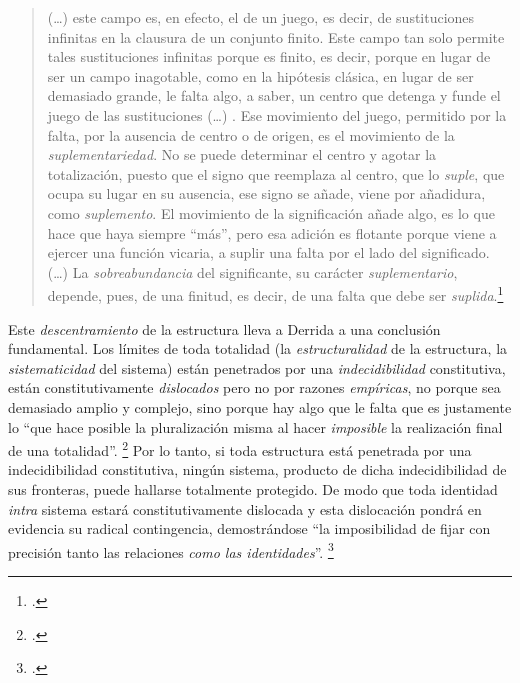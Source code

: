 \begin{quote}
(\ldots) este campo es, en efecto, el de un juego, es decir, de sustituciones infinitas en la clausura de un conjunto finito. Este campo tan solo permite tales sustituciones infinitas porque es finito, es decir, porque en lugar de ser un campo inagotable, como en la hipótesis clásica, en lugar de ser demasiado grande, le falta algo, a saber, un centro que detenga y funde el juego de las sustituciones (\ldots) . Ese movimiento del juego, permitido por la falta, por la ausencia de centro o de origen, es el movimiento de la \emph{suplementariedad}. No se puede determinar el centro y agotar la totalización, puesto que el signo que reemplaza al centro, que lo \emph{suple}, que ocupa su lugar en su ausencia, ese signo se añade, viene por añadidura, como \emph{suplemento}. El movimiento de la significación añade algo, es lo que hace que haya siempre \enquote{más}, pero esa adición es flotante porque viene a ejercer una función vicaria, a suplir una falta por el lado del significado. (\ldots) La \emph{sobreabundancia} del significante, su carácter \emph{suplementario}, depende, pues, de una finitud, es decir, de una falta que debe ser \emph{suplida}.\footcite[][397-398]{@6997-DERRIDA1989}
\end{quote}

Este \emph{descentramiento} de la estructura lleva a Derrida a una conclusión fundamental. Los límites de toda totalidad (la \emph{estructuralidad} de la estructura, la \emph{sistematicidad} del sistema) están penetrados por una \emph{indecidibilidad} constitutiva, están constitutivamente \emph{dislocados} pero no por razones \emph{empíricas}, no porque sea demasiado amplio y complejo, sino porque hay algo que le falta  que es justamente lo \enquote{que hace posible la pluralización misma al hacer \emph{imposible} la realización final de una totalidad}. \footcite[][33]{@6997-DERRIDA1989} Por lo tanto, si toda estructura está penetrada por una indecidibilidad constitutiva, ningún sistema, producto de dicha indecidibilidad de sus fronteras, puede hallarse totalmente protegido. De modo que toda identidad \emph{intra} sistema estará constitutivamente dislocada y esta dislocación pondrá en evidencia su radical contingencia, demostrándose \enquote{la imposibilidad de fijar con precisión  tanto las relaciones \emph{como las identidades}}. \footcite[][37]{@6999-LACLAU1990}

